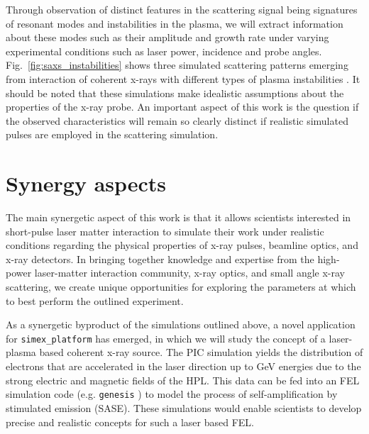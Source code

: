 \documentclass[12pt]{scrartcl}
\begin{document}
Through observation of distinct features in the
scattering signal being signatures of resonant modes and instabilities in the
plasma, we will extract information about these modes such as their amplitude
and growth rate under varying experimental conditions such as laser power,
incidence and probe angles. Fig.~\ref{fig:saxs_instabilities} shows three
simulated scattering patterns emerging from interaction of coherent x-rays with
different types of plasma instabilities \cite{} .
It should be noted that these simulations make idealistic assumptions about the
properties of the x-ray probe. An important aspect of this work is the question
if the observed characteristics will remain so clearly distinct if realistic
simulated pulses are employed in the scattering simulation.

\section{Synergy aspects}

The main synergetic aspect of this work is that it allows scientists interested
in short-pulse laser matter interaction to simulate their work under realistic
conditions regarding the physical properties of x-ray pulses, beamline optics,
and x-ray detectors.
In bringing together knowledge and expertise from the high-power
laser-matter interaction community, x-ray optics, and small angle x-ray
scattering, we create unique opportunities for exploring the parameters
at which to best perform the outlined experiment.

As a synergetic byproduct of the simulations outlined above, a
novel application for \texttt{simex\_platform} has emerged,
in which we will
study the concept of a laser-plasma based coherent x-ray source. The PIC
simulation yields the distribution of electrons that are accelerated in the
laser direction up to GeV energies due to the strong electric and
magnetic fields of the HPL. This data can be fed into an FEL simulation code
(e.g. \texttt{genesis} \cite{Reiche1999}) to model the process of
self-amplification by stimulated emission (SASE). These simulations would enable
scientists to develop precise and realistic concepts for such a laser based FEL.
\end{document}
